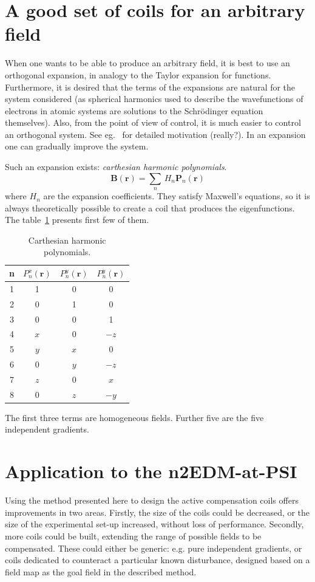\section{A good set of coils for an arbitrary field}
When one wants to be able to produce an arbitrary field, it is best to use an orthogonal expansion, in analogy to the Taylor expansion for functions. Furthermore, it is desired that the terms of the expansions are natural for the system considered (as spherical harmonics used to describe the wavefunctions of electrons in atomic systems are solutions to the Schrödinger equation themselves). Also, from the point of view of control, it is much easier to control an orthogonal system. See eg. \,\citep{Branch1984} for detailed motivation (really?). In an expansion one can gradually improve the system.

Such an expansion exists: \emph{carthesian harmonic polynomials}.
\begin{equation}
  \mathbf{B}(\mathbf{r}) = \sum_{n}\,H_n\mathbf{P}_n(\mathbf{r})
\end{equation}
where $H_n$ are the expansion coefficients. They satisfy Maxwell's equations, so it is always theoretically possible to create a coil that produces the eigenfunctions. The table~\ref{tab:coils_carthesian_harmonics} presents first few of them.

\begin{table}
  \centering
  \begin{tabular}{c|ccc}
    n & $P_n^x(\mathbf{r})$ & $P_n^y(\mathbf{r})$ & $P_n^y(\mathbf{r})$ \\ \hline
    1 & 1 & 0 & 0 \\
    2 & 0 & 1 & 0 \\
    3 & 0 & 0 & 1 \\ \hline
    4 & $x$ &  0  & $-z$ \\
    5 & $y$ & $x$ &   0  \\
    6 &  0  & $y$ & $-z$ \\
    7 & $z$ &  0  & $ x$ \\
    8 &  0  & $z$ & $-y$ \\
  \end{tabular}
  \caption{Carthesian harmonic polynomials.}
  \label{tab:coils_carthesian_harmonics}
\end{table}

The first three terms are homogeneous fields. Further five are the five independent gradients.



\section{Application to the n2EDM-at-PSI}
Using the method presented here to design the active compensation coils offers improvements in two areas. Firstly, the size of the coils could be decreased, or the size of the experimental set-up increased, without loss of performance. Secondly, more coils could be built, extending the range of possible fields to be compensated. These could either be generic: e.g. pure independent gradients, or coils dedicated to counteract a particular known disturbance, designed based on a field map as the goal field in the described method.

